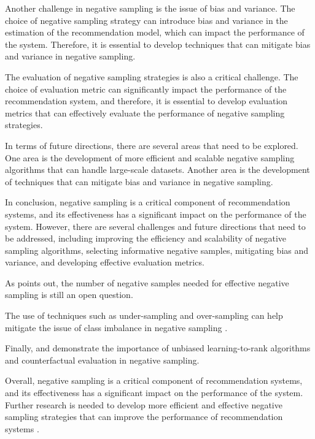 \documentclass[11pt,a4paper]{article}
\begin{document}
Another challenge in negative sampling is the issue of bias and variance. The choice of negative sampling strategy can introduce bias and variance in the estimation of the recommendation model, which can impact the performance of the system. Therefore, it is essential to develop techniques that can mitigate bias and variance in negative sampling. 

The evaluation of negative sampling strategies is also a critical challenge. The choice of evaluation metric can significantly impact the performance of the recommendation system, and therefore, it is essential to develop evaluation metrics that can effectively evaluate the performance of negative sampling strategies. 

In terms of future directions, there are several areas that need to be explored. One area is the development of more efficient and scalable negative sampling algorithms that can handle large-scale datasets. Another area is the development of techniques that can mitigate bias and variance in negative sampling. 

In conclusion, negative sampling is a critical component of recommendation systems, and its effectiveness has a significant impact on the performance of the system. However, there are several challenges and future directions that need to be addressed, including improving the efficiency and scalability of negative sampling algorithms, selecting informative negative samples, mitigating bias and variance, and developing effective evaluation metrics. 

As \cite{doi:10.24963/ijcai.2022/348} points out, the number of negative samples needed for effective negative sampling is still an open question. 

The use of techniques such as under-sampling and over-sampling can help mitigate the issue of class imbalance in negative sampling \cite{doi:10.1002/cpe.7894}. 

Finally, \cite{doi:10.1145/3308558.3313447} and \cite{doi:10.1145/3394486.3403229} demonstrate the importance of unbiased learning-to-rank algorithms and counterfactual evaluation in negative sampling. 

Overall, negative sampling is a critical component of recommendation systems, and its effectiveness has a significant impact on the performance of the system. Further research is needed to develop more efficient and effective negative sampling strategies that can improve the performance of recommendation systems \cite{doi:10.1109/tpami.2024.3371473}.
\end{document}
